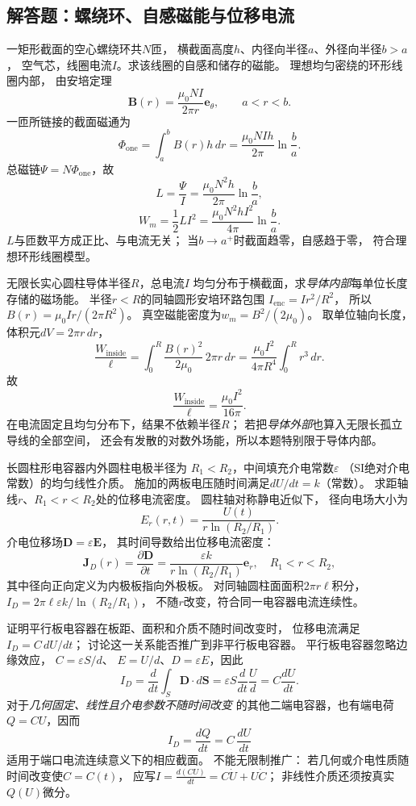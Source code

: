 
\subsection{解答题：螺绕环、自感磁能与位移电流}

\problemtext 一矩形截面的空心螺绕环共$N$匝，
横截面高度$h$、内径向半径$a$、外径向半径$b>a$，
空气芯，线圈电流$I$。求该线圈的自感和储存的磁能。
\workings
理想均匀密绕的环形线圈内部，
由安培定理
\[
\bm B(r)=\frac{\mu_0NI}{2\pi r}\bm e_\theta,
\qquad a<r<b.
\]
一匝所链接的截面磁通为
\[
\Phi_{\mathrm{one}}=\int_a^b B(r)h\,dr
=\frac{\mu_0NIh}{2\pi}\ln\frac ba.
\]
总磁链$\Psi=N\Phi_{\mathrm{one}}$，故
\[
\boxed{L=\frac{\Psi}{I}
=\frac{\mu_0N^2h}{2\pi}\ln\frac ba},
\]
\[
\boxed{W_m=\frac12 LI^2
=\frac{\mu_0N^2hI^2}{4\pi}\ln\frac ba}.
\]
\crosscheck $L$与匝数平方成正比、与电流无关；
当$b\to a^+$时截面趋零，自感趋于零，
符合理想环形线圈模型。

\problemtext 无限长实心圆柱导体半径$R$，总电流$I$
均匀分布于横截面，求\emph{导体内部}每单位长度存储的磁场能。
\workings
半径$r<R$的同轴圆形安培环路包围
$I_{\mathrm{enc}}=I r^2/R^2$，
所以
$B(r)=\mu_0Ir/(2\pi R^2)$。
真空磁能密度为$w_m=B^2/(2\mu_0)$。
取单位轴向长度，体积元$dV=2\pi r\,dr$，
\[
\frac{W_{\mathrm{inside}}}{\ell}
=\int_0^R\frac{B(r)^2}{2\mu_0}\,2\pi r\,dr
=\frac{\mu_0I^2}{4\pi R^4}\int_0^Rr^3\,dr.
\]
故
\[
\boxed{\frac{W_{\mathrm{inside}}}{\ell}
=\frac{\mu_0I^2}{16\pi}}.
\]
\crosscheck 在电流固定且均匀分布下，结果不依赖半径$R$；
若把\emph{导体外部}也算入无限长孤立导线的全部空间，
还会有发散的对数外场能，所以本题特别限于导体内部。

\problemtext 长圆柱形电容器内外圆柱电极半径为
$R_1<R_2$，中间填充介电常数$\varepsilon$
（SI绝对介电常数）的均匀线性介质。
施加的两板电压随时间满足$dU/dt=k$（常数）。
求距轴线$r$、$R_1<r<R_2$处的位移电流密度。
\workings
圆柱轴对称静电近似下，
径向电场大小为
\[
E_r(r,t)=\frac{U(t)}{r\ln(R_2/R_1)}.
\]
介电位移场$\bm D=\varepsilon\bm E$，
其时间导数给出位移电流密度：
\[
\boxed{\bm J_D(r)=\frac{\partial\bm D}{\partial t}
=\frac{\varepsilon k}{r\ln(R_2/R_1)}\bm e_r},
\quad R_1<r<R_2,
\]
其中径向正向定义为内极板指向外极板。
\crosscheck 对同轴圆柱面面积$2\pi r\ell$积分，
$I_D=2\pi\ell\varepsilon k/\ln(R_2/R_1)$，
不随$r$改变，符合同一电容器电流连续性。

\problemtext 证明平行板电容器在板距、面积和介质不随时间改变时，
位移电流满足$I_D=C\,dU/dt$；
讨论这一关系能否推广到非平行板电容器。
\workings
平行板电容器忽略边缘效应，
$C=\varepsilon S/d$、
$E=U/d$、$D=\varepsilon E$，因此
\[
I_D=\frac d{dt}\int_S\bm D\cdot d\bm S
=\varepsilon S\frac{d}{dt}\frac Ud
=\boxed{C\frac{dU}{dt}}.
\]
对于\emph{几何固定、线性且介电参数不随时间改变}
的其他二端电容器，也有端电荷$Q=CU$，因而
\[
\boxed{I_D=\frac{dQ}{dt}=C\,\frac{dU}{dt}}
\]
适用于端口电流连续意义下的相应截面。
\crosscheck 不能无限制推广：
若几何或介电性质随时间改变使$C=C(t)$，
应写$I=\frac{d(CU)}{dt}=C\dot U+U\dot C$；
非线性介质还须按真实$Q(U)$微分。

